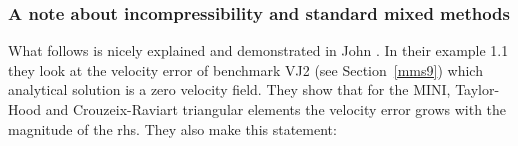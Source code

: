 \subsubsection{A note about incompressibility and standard mixed methods}

What follows is nicely explained and demonstrated in John \etal \cite{jolm17}. In their 
example 1.1 they look at the velocity error of benchmark VJ2 (see Section~\ref{mms9}) 
which analytical solution is a zero velocity field. They show that for the MINI, 
Taylor-Hood and Crouzeix-Raviart triangular elements the velocity error grows 
with the magnitude of the rhs. They also make this statement:


